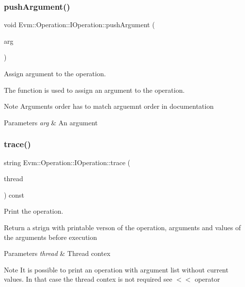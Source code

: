 \subsubsection{\texorpdfstring{push\+Argument()}{pushArgument()}}
{\footnotesize\ttfamily void Evm\+::\+Operation\+::\+I\+Operation\+::push\+Argument (\begin{DoxyParamCaption}\item[{Argument\+Ptr}]{arg }\end{DoxyParamCaption})\hspace{0.3cm}{\ttfamily [inline]}}



Assign argument to the operation. 

The function is used to assign an argument to the operation. \begin{DoxyNote}{Note}
Arguments order has to match arguemnt order in documentation 
\end{DoxyNote}

\begin{DoxyParams}{Parameters}
{\em arg} & An argument \\
\hline
\end{DoxyParams}
\mbox{\label{struct_evm_1_1_operation_1_1_i_operation_a32fef14914757a5c2312595810f363d1}} 
\subsubsection{\texorpdfstring{trace()}{trace()}}
{\footnotesize\ttfamily string Evm\+::\+Operation\+::\+I\+Operation\+::trace (\begin{DoxyParamCaption}\item[{\mbox{\hyperlink{struct_evm_1_1_thread_context}{Thread\+Context}} \&}]{thread }\end{DoxyParamCaption}) const}



Print the operation. 

Return a strign with printable verson of the operation, arguments and values of the arguments before execution 
\begin{DoxyParams}{Parameters}
{\em thread} & Thread contex \\
\hline
\end{DoxyParams}
\begin{DoxyNote}{Note}
It is possible to print an operation with argument list without current values. In that case the thread contex is not required see $<$$<$ operator 
\end{DoxyNote}


